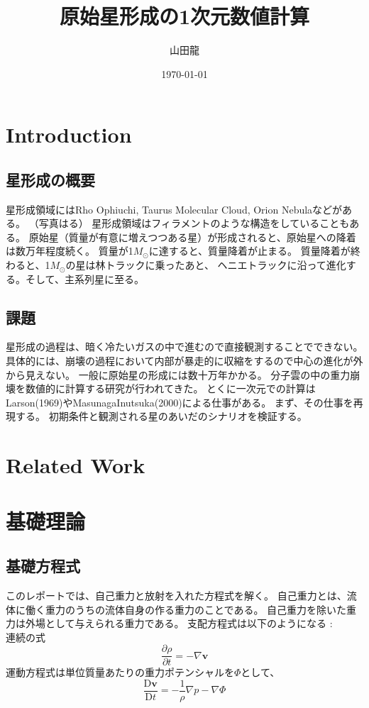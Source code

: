 \documentclass{jsarticle}
\date{\today}
\author{山田龍}
\title{原始星形成の1次元数値計算}
\newcommand{\bv}{\mathbf{v}}
\newcommand{\pder}[2][]{\frac{\partial#1}{\partial#2}}
\newcommand{\Dder}[2][]{\frac{\mathrm{D}#1}{\mathrm{D}#2}}
\begin{document}
\maketitle
\section{Introduction}
\subsection{星形成の概要}
星形成領域にはRho Ophiuchi, Taurus Molecular Cloud, Orion Nebulaなどがある。
（写真はる）
星形成領域はフィラメントのような構造をしていることもある。
原始星（質量が有意に増えつつある星）が形成されると、原始星への降着は数万年程度続く。
質量が1$M_\odot$に達すると、質量降着が止まる。
質量降着が終わると、1$M_\odot$の星は林トラックに乗ったあと、
ヘニエトラックに沿って進化する。そして、主系列星に至る。

\subsection{課題}
星形成の過程は、暗く冷たいガスの中で進むので直接観測することでできない。
具体的には、崩壊の過程において内部が暴走的に収縮をするので中心の進化が外から見えない。
一般に原始星の形成には数十万年かかる。
分子雲の中の重力崩壊を数値的に計算する研究が行われてきた。
とくに一次元での計算はLarson(1969)やMasunagaInutsuka(2000)による仕事がある。
まず、その仕事を再現する。
初期条件と観測される星のあいだのシナリオを検証する。

\section{Related Work}
\section{基礎理論}
\subsection{基礎方程式}
このレポートでは、自己重力と放射を入れた方程式を解く。
自己重力とは、流体に働く重力のうちの流体自身の作る重力のことである。
自己重力を除いた重力は外場として与えられる重力である。
支配方程式は以下のようになる :\\
連続の式
\begin{equation}
    \pder[\rho]{t} = - \nabla \bv
\end{equation}
運動方程式は単位質量あたりの重力ポテンシャルを$\Phi$として、
\begin{equation}
    \Dder[\bv]{t} = - \frac{1}{\rho}\nabla{p} - \nabla\Phi\label{eq:euler}
\end{equation}
\end{document}

